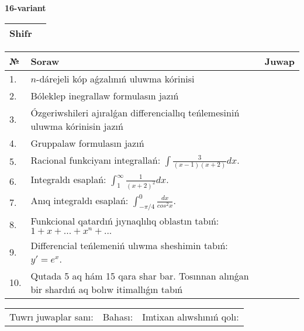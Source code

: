 \documentclass{article}
\begin{document}
  \egroup
  
  \newpage
  
  
  \textbf{16-variant}\\
  
  \bgroup
  \def\arraystretch{1.6} %
  
  \begin{tabular}{|m{5.7cm}|m{9.5cm}|}
  \hline
  Shifr & \\
  \hline
  \end{tabular}
  
  \vspace{1cm}
  
  \begin{tabular}{|m{0.7cm}|m{10cm}|m{4cm}|}
  \hline
  № & Soraw & Juwap \\
  \hline
  1. & \(n\)-dárejeli kóp aǵzalınıń uluwma kórinisi &  \\
  \hline
  2. & Bóleklep inegrallaw formulasın jazıń &  \\
  \hline
  3. & Ózgeriwshileri ajıralǵan differenciallıq teńlemesiniń uluwma kórinisin jazıń &  \\
  \hline
  4. & Gruppalaw formulasın jazıń &  \\
  \hline
  5. & Racional funkciyanı integrallań: \(\int{\frac{3}{(x - 1)(x + 2)}dx}\). &  \\
  \hline
  6. & Integraldı esaplań: \(\int_{1}^{\infty}{\frac{1}{(x + 2)^2 }dx}\). &  \\
  \hline
  7. & Anıq integraldı esaplań: \(\int_{- \pi/4}^{0}\frac{dx}{cos^2 x}\). &  \\
  \hline
  8. & Funkcional qatardıń jıynaqlılıq oblastın tabıń:\(1 + x + ... + x^{n} + ...\) &  \\
  \hline
  9. & Differencial teńlemeniń ulıwma sheshimin tabıń: \(y' = e^{x}\). &  \\
  \hline
  10. & Qutada 5 aq hám 15 qara shar bar. Tosınnan alınǵan bir shardıń aq bolıw itimallıǵın tabıń &  \\
  \hline
  \end{tabular}
  
  \vspace{1cm}
  
  \begin{tabular}{lll}
  Tuwrı juwaplar sanı: \underline{\hspace{1.5cm}} & 
  Bahası: \underline{\hspace{1.5cm}} & 
  Imtixan alıwshınıń qolı: \underline{\hspace{2cm}} \\
  \end{tabular}
  
\end{document}

